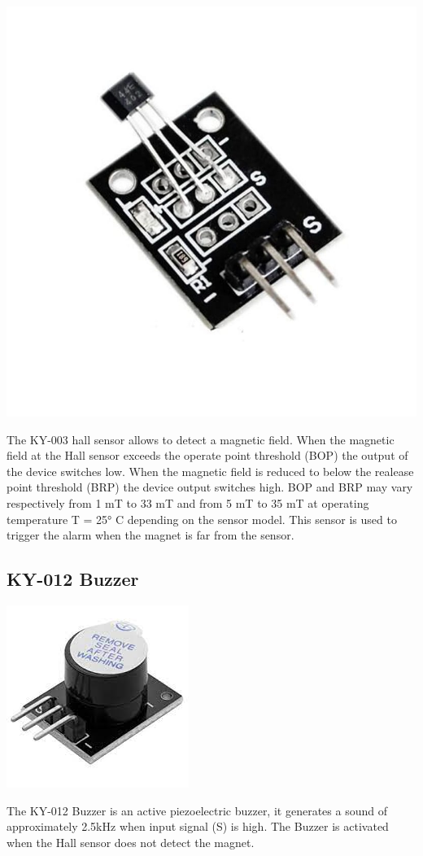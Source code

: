 \documentclass[]{article}
\begin{document}
\begin{center}
    \includegraphics[scale=0.2]{ky-003}
\end{center}
The KY-003 hall sensor allows to detect a magnetic field. When the magnetic field at the Hall sensor exceeds
the operate point threshold (BOP) the output of the device switches low. When the magnetic field is reduced
to below the realease point threshold (BRP) the device output switches high.
BOP and BRP may vary respectively from 1 mT to 33 mT and from 5 mT to 35 mT at operating 
temperature T = 25° C depending on the sensor model.
This sensor is used to trigger the alarm when the magnet is far from the sensor.

\subsection{KY-012 Buzzer}

\begin{center}
    \includegraphics[scale=0.4]{ky-012}
\end{center}
The KY-012 Buzzer is an active piezoelectric buzzer, it generates a sound of approximately 2.5kHz when 
input signal (S) is high. The Buzzer is activated when the Hall sensor does not detect the magnet.
\end{document}
